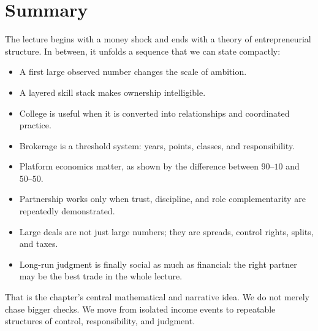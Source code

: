 \section{Summary}

The lecture begins with a money shock and ends with a theory of entrepreneurial structure. In between, it unfolds a sequence that we can state compactly:

\begin{itemize}
\item A first large observed number changes the scale of ambition.
\item A layered skill stack makes ownership intelligible.
\item College is useful when it is converted into relationships and coordinated practice.
\item Brokerage is a threshold system: years, points, classes, and responsibility.
\item Platform economics matter, as shown by the difference between \(90\text{--}10\) and \(50\text{--}50\).
\item Partnership works only when trust, discipline, and role complementarity are repeatedly demonstrated.
\item Large deals are not just large numbers; they are spreads, control rights, splits, and taxes.
\item Long-run judgment is finally social as much as financial: the right partner may be the best trade in the whole lecture.
\end{itemize}

That is the chapter's central mathematical and narrative idea. We do not merely chase bigger checks. We move from isolated income events to repeatable structures of control, responsibility, and judgment.